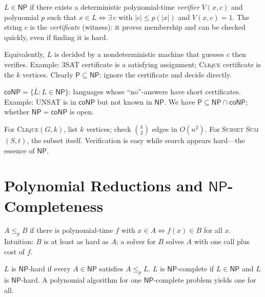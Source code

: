 \begin{definition}
$L\in\mathsf{NP}$ if there exists a deterministic polynomial-time \emph{verifier} $V(x,c)$ and polynomial $p$ such that $x\in L \iff \exists\, c$ with $|c|\le p(|x|)$ and $V(x,c)=1$.
The string $c$ is the \emph{certificate} (witness): it proves membership and can be checked quickly, even if finding it is hard.
\end{definition}
Equivalently, $L$ is decided by a nondeterministic machine that guesses $c$ then verifies.
Example: \textsc{3SAT} certificate is a satisfying assignment; \textsc{Clique} certificate is the $k$ vertices.
Clearly $\mathsf{P}\subseteq\mathsf{NP}$: ignore the certificate and decide directly.

\begin{remark}
$\mathsf{coNP}=\{\overline{L}:L\in\mathsf{NP}\}$: languages whose ``no''-answers have short certificates.
Example: \textsc{UNSAT} is in $\mathsf{coNP}$ but not known in $\mathsf{NP}$.
We have $\mathsf{P}\subseteq\mathsf{NP}\cap\mathsf{coNP}$; whether $\mathsf{NP}=\mathsf{coNP}$ is open.
\end{remark}

\begin{example}
For \textsc{Clique}$(G,k)$, list $k$ vertices; check $\binom{k}{2}$ edges in $O(n^2)$. For \textsc{Subset Sum}$(S,t)$, the subset itself. Verification is easy while search appears hard---the essence of $\mathsf{NP}$.
\end{example}

\section{\texorpdfstring{Polynomial Reductions and $\mathsf{NP}$-Completeness}{Polynomial Reductions and NP-Completeness}}
\label{sec:npc}

\begin{definition}
$A\le_p B$ if there is polynomial-time $f$ with $x\in A \iff f(x)\in B$ for all $x$. Intuition: $B$ is at least as hard as $A$; a solver for $B$ solves $A$ with one call plus cost of $f$.
\end{definition}

\begin{definition}
$L$ is $\mathsf{NP}$-hard if every $A\in\mathsf{NP}$ satisfies $A\le_p L$.
$L$ is $\mathsf{NP}$-complete if $L\in\mathsf{NP}$ and $L$ is $\mathsf{NP}$-hard.
A polynomial algorithm for one $\mathsf{NP}$-complete problem yields one for all.
\end{definition}

